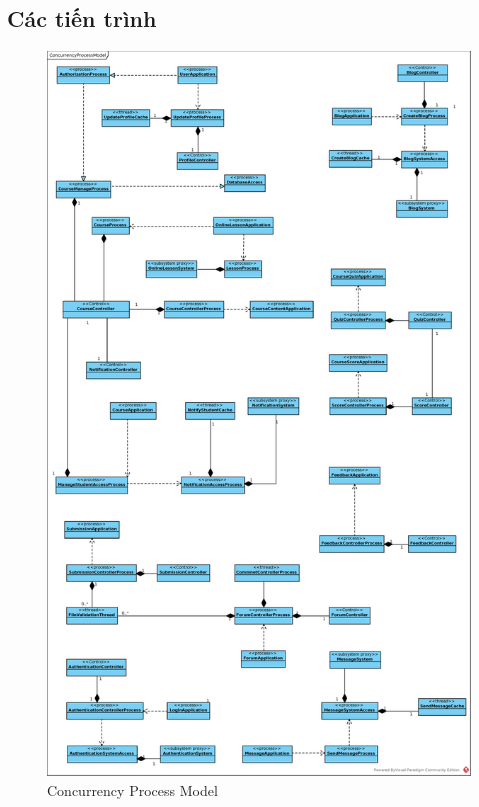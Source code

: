 \documentclass[./../main.tex]{subfiles}
\begin{document}
	\subsection{Các tiến trình}
	\begin{figure}[H]
		\centering
		\includegraphics[width=0.75\linewidth]{./images/ConcurrencyProcessModel.eps}
		\caption{Concurrency Process Model}
	\end{figure}
\end{document}
